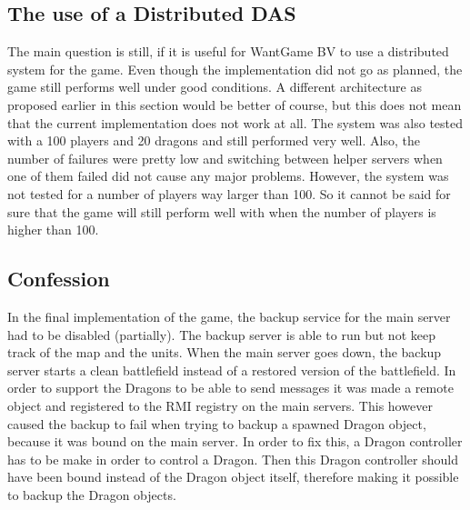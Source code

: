 \subsection{The use of a Distributed DAS}
The main question is still, if it is useful for WantGame BV to use a distributed system for the game.
Even though the implementation did not go as planned, the game still performs well under good conditions.
A different architecture as proposed earlier in this section would be better of course, but this does not mean that the current implementation does not work at all.
The system was also tested with a 100 players and 20 dragons and still performed very well.
Also, the number of failures were pretty low and switching between helper servers when one of them failed did not cause any major problems.
However, the system was not tested for a number of players way larger than 100.
So it cannot be said for sure that the game will still perform well with when the number of players is higher than 100.

\subsection{Confession}
In the final implementation of the game, the backup service for the main server had to be disabled (partially).
The backup server is able to run but not keep track of the map and the units. 
When the main server goes down, the backup server starts a clean battlefield instead of a restored version of the battlefield.
In order to support the Dragons to be able to send messages it was made a remote object and registered to the RMI registry on the main servers.
This however caused the backup to fail when trying to backup a spawned Dragon object, because it was bound on the main server.
In order to fix this, a Dragon controller has to be make in order to control a Dragon. 
Then this Dragon controller should have been bound instead of the Dragon object itself, therefore making it possible to backup the Dragon objects.



